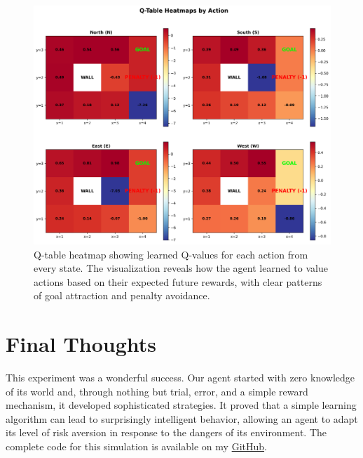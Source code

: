 \documentclass[11pt, a4paper]{article}
\begin{document}
\begin{figure}[H]
    \centering
    \includegraphics[width=\textwidth]{images/q_table_heatmap.png}
    \caption{Q-table heatmap showing learned Q-values for each action from every state. The visualization reveals how the agent learned to value actions based on their expected future rewards, with clear patterns of goal attraction and penalty avoidance.}\label{fig:q_table_heatmap}
\end{figure}

\section{Final Thoughts}
This experiment was a wonderful success. Our agent started with zero knowledge of its world and, through nothing but trial, error, and a simple reward mechanism, it developed sophisticated strategies. It proved that a simple learning algorithm can lead to surprisingly intelligent behavior, allowing an agent to adapt its level of risk aversion in response to the dangers of its environment. The complete code for this simulation is available on my \href{https://github.com/Jeevan-HM/RL-in-Robotics.git}{GitHub}.
\end{document}
